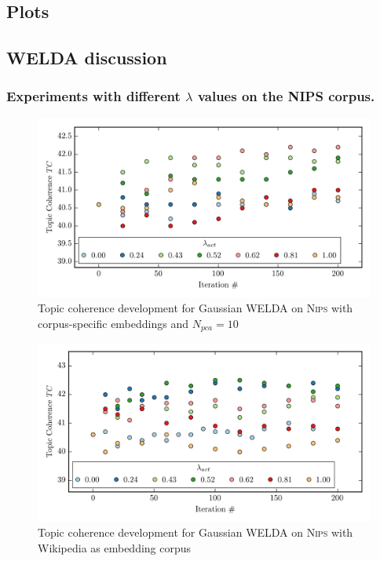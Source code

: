 \documentclass[
        a4paper,
        titlepage,
        twoside,
        parskip,
        numbers=noenddot
        ]{scrbook}
\theoremstyle{break}
\begin{document}
\begin{appendices}
\chapter{Plots}
  \section{WELDA discussion}
  \subsection{Experiments with different $\lambda$ values on the N{\footnotesize IPS} corpus.}
  \label{sec:appendix_nips_lambda}
  \begin{figure}[H]
         \centering
         \includegraphics[width=\textwidth]{figures/welda_gaussian_nips_50.png}
         \caption{Topic coherence development for Gaussian WELDA on \textsc{Nips} with corpus-specific embeddings and $N_{pca} = 10$}
         \label{fig:welda_gaussian_nips_50}
  \end{figure}
  \begin{figure}[H]
         \centering
         \includegraphics[width=\textwidth]{figures/welda_gaussian_nips_200.png}
         \caption{Topic coherence development for Gaussian WELDA on \textsc{Nips} with Wikipedia as embedding corpus}
         \label{fig:welda_gaussian_nips_200}
  \end{figure}


\end{appendices}
\end{document}
